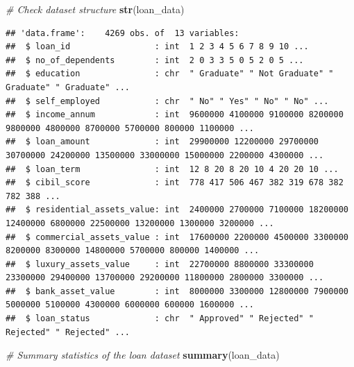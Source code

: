 \documentclass[
]{article}
\newenvironment{Shaded}{\begin{snugshade}}{\end{snugshade}}
\newcommand{\CommentTok}[1]{\textcolor[rgb]{0.56,0.35,0.01}{\textit{#1}}}
\newcommand{\FunctionTok}[1]{\textcolor[rgb]{0.13,0.29,0.53}{\textbf{#1}}}
\newcommand{\NormalTok}[1]{#1}
\begin{document}
\begin{Shaded}
\begin{Highlighting}[]
\CommentTok{\# Check dataset structure}
\FunctionTok{str}\NormalTok{(loan\_data)}
\end{Highlighting}
\end{Shaded}

\begin{verbatim}
## 'data.frame':    4269 obs. of  13 variables:
##  $ loan_id                 : int  1 2 3 4 5 6 7 8 9 10 ...
##  $ no_of_dependents        : int  2 0 3 3 5 0 5 2 0 5 ...
##  $ education               : chr  " Graduate" " Not Graduate" " Graduate" " Graduate" ...
##  $ self_employed           : chr  " No" " Yes" " No" " No" ...
##  $ income_annum            : int  9600000 4100000 9100000 8200000 9800000 4800000 8700000 5700000 800000 1100000 ...
##  $ loan_amount             : int  29900000 12200000 29700000 30700000 24200000 13500000 33000000 15000000 2200000 4300000 ...
##  $ loan_term               : int  12 8 20 8 20 10 4 20 20 10 ...
##  $ cibil_score             : int  778 417 506 467 382 319 678 382 782 388 ...
##  $ residential_assets_value: int  2400000 2700000 7100000 18200000 12400000 6800000 22500000 13200000 1300000 3200000 ...
##  $ commercial_assets_value : int  17600000 2200000 4500000 3300000 8200000 8300000 14800000 5700000 800000 1400000 ...
##  $ luxury_assets_value     : int  22700000 8800000 33300000 23300000 29400000 13700000 29200000 11800000 2800000 3300000 ...
##  $ bank_asset_value        : int  8000000 3300000 12800000 7900000 5000000 5100000 4300000 6000000 600000 1600000 ...
##  $ loan_status             : chr  " Approved" " Rejected" " Rejected" " Rejected" ...
\end{verbatim}

\begin{Shaded}
\begin{Highlighting}[]
\CommentTok{\# Summary statistics of the loan dataset}
\FunctionTok{summary}\NormalTok{(loan\_data)}
\end{Highlighting}
\end{Shaded}
\end{document}
